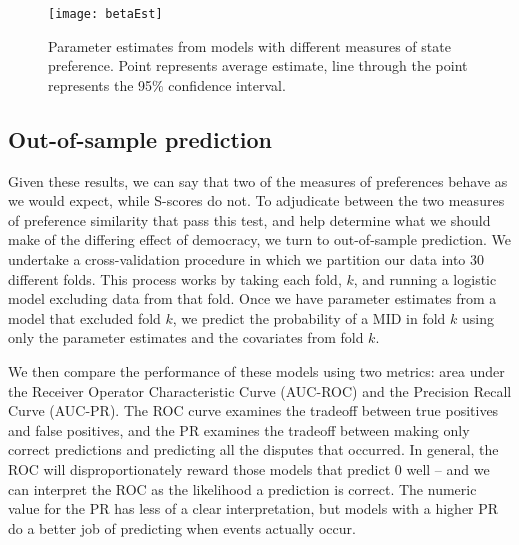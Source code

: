 

\begin{figure}[ht]
	\centering
	\texttt{[image: betaEst]}
	\caption{Parameter estimates from models with different measures of state preference. Point represents average estimate, line through the point represents the 95\% confidence interval.}
	\label{fig:coefP}
\end{figure}
\FloatBarrier

\subsection*{Out-of-sample prediction}

Given these results, we can say that two of the measures of preferences behave as we would expect, while S-scores do not. To adjudicate between the two measures of preference similarity that pass this test, and help determine what we should make of the differing effect of democracy, we turn to out-of-sample prediction. We undertake a cross-validation procedure in which we partition our data into 30 different folds. This process works by taking each fold, $k$, and running a logistic model excluding data from that fold. Once we have parameter estimates from a model that excluded fold $k$, we predict the probability of a MID in fold $k$ using only the parameter estimates and the covariates from fold $k$.

We then compare the performance of these models using two metrics: area under the Receiver Operator Characteristic Curve (AUC-ROC) and the Precision Recall Curve (AUC-PR). The ROC curve examines the tradeoff between true positives and false positives, and the PR examines the tradeoff between making only correct predictions and predicting all the disputes that occurred. In general, the ROC will disproportionately reward those models that predict $0$ well -- and we can interpret the ROC as the likelihood a prediction is correct. The numeric value for the PR has less of a clear interpretation, but models with a higher PR do a better job of predicting when events actually occur.

